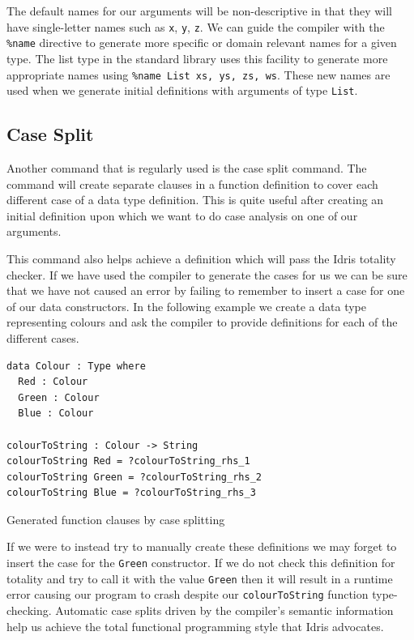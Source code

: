 \documentclass[a4paper, notitlepage]{report}
\begin{document}
The default names for our arguments will be non-descriptive in that they will
have single-letter names such as \texttt{x}, \texttt{y}, \texttt{z}. We can guide the compiler with the
\texttt{\%name} directive to generate more specific or domain relevant names for a given
type. The list type in the standard library uses this facility to generate more
appropriate names using \texttt{\%name List xs, ys, zs, ws}. These new names are used when
we generate initial definitions with arguments of type \texttt{List}.

\subsection{Case Split}
\label{sec:orgba3725e}
Another command that is regularly used is the case split command. The command
will create separate clauses in a function definition to cover each different
case of a data type definition. This is quite useful after creating an initial
definition upon which we want to do case analysis on one of our arguments.

This command also helps achieve a definition which will pass the Idris totality
checker. If we have used the compiler to generate the cases for us we can be
sure that we have not caused an error by failing to remember to insert a case
for one of our data constructors. In the following example we create a data type
representing colours and ask the compiler to provide definitions for each of the
different cases.

\begin{listing}[H]
\begin{verbatim}
data Colour : Type where
  Red : Colour
  Green : Colour
  Blue : Colour

colourToString : Colour -> String
colourToString Red = ?colourToString_rhs_1
colourToString Green = ?colourToString_rhs_2
colourToString Blue = ?colourToString_rhs_3
\end{verbatim}
\caption{Generated function clauses by case splitting}
\end{listing}

If we were to instead try to manually create these definitions we may forget to
insert the case for the \texttt{Green} constructor. If we do not check this definition
for totality and try to call it with the value \texttt{Green} then it will result in a
runtime error causing our program to crash despite our \texttt{colourToString} function
type-checking. Automatic case splits driven by the compiler's semantic
information help us achieve the total functional programming style that Idris
advocates.
\end{document}
